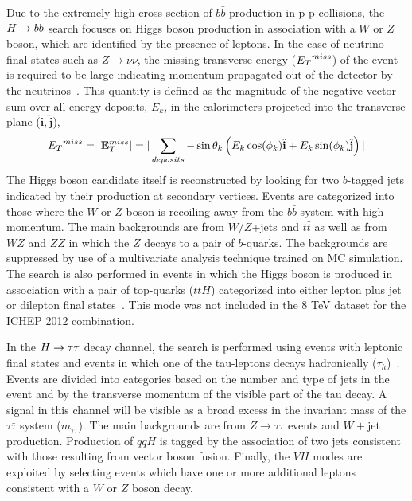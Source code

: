 Due to the extremely high cross-section of $b\bar{b}$ production in 
p-p collisions, the $H\rightarrow bb$ search focuses on Higgs boson production in association
with a $W$ or $Z$ boson, which are identified by the presence of leptons. In the case 
of neutrino final states such as $Z\rightarrow \nu\nu$, the missing transverse energy 
(${E_{T}}^{miss}$) of the event is required to be large indicating momentum propagated out of the detector by the neutrinos~\citep{HIG-12-019}. 
This quantity is defined as the magnitude of the negative vector sum over all energy deposits, 
$E_{k}$, in the calorimeters projected into the transverse plane 
 ($\hat{\mathbf{i}},\hat{\mathbf{j}}$),
\begin{equation}
{E_{T}}^{miss} = |{\mathbf{E}^{miss}_{T}}| =|\sum_{deposits} -\sin\theta_{k}\left(E_{k}\cos(\phi_{k})\hat{\mathbf{i}}+E_{k}\sin(\phi_{k})\hat{\mathbf{j}}\right)|
\end{equation}
The Higgs boson candidate itself is reconstructed by looking for two 
$b$-tagged jets indicated by their production at secondary vertices. Events are 
categorized into those where the 
$W$ or $Z$ boson is recoiling away from the $b\bar{b}$ system with high momentum.
The main backgrounds are from $W/Z$+jets and $t\bar{t}$ as well as from $WZ$ and $ZZ$
in which the $Z$ decays to a pair of $b$-quarks. The backgrounds are suppressed
by use of a multivariate analysis technique trained on MC simulation.
The search is also performed in events in which the Higgs boson is produced in association
with a pair of top-quarks ($ttH$) categorized into either lepton plus jet or dilepton 
final states~\citep{HIG-12-019}. This mode was not included in the 8 TeV dataset
for the ICHEP 2012 combination.

In the $H\rightarrow\tau\tau$ decay channel, the search is performed using events with leptonic
final states and events in which one of the tau-leptons decays hadronically 
($\tau_{h}$)~\citep{HIG-12-018}.
Events are divided into categories based on the number and type of jets in the event
and by the transverse momentum of the visible part of the tau decay.
A signal in this channel will be visible as a broad excess in the invariant mass
of the $\tau\bar{\tau}$ system ($m_{\tau\tau}$). The main backgrounds are from
$Z\rightarrow\tau\tau$ events and $W+$jet production. 
Production of $qqH$ is tagged by the association of two jets consistent with 
those resulting from vector boson fusion. Finally, the $VH$ modes are
exploited by selecting events which have one or more additional leptons 
consistent with a $W$ or $Z$ boson decay.

